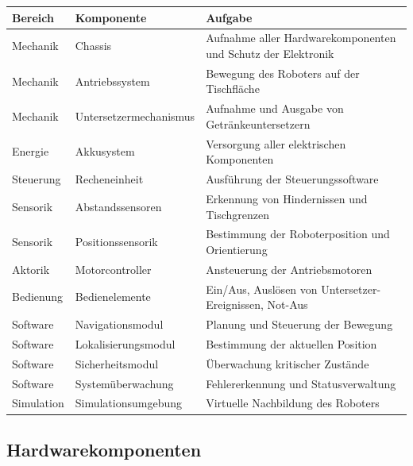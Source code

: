 \begin{longtable}[]{@{}
  >{\raggedright\arraybackslash}p{}
  >{\raggedright\arraybackslash}p{}
  >{\raggedright\arraybackslash}p{}@{}}
\toprule\noalign{}
\begin{minipage}[b]{\linewidth}\raggedright
Bereich
\end{minipage} & \begin{minipage}[b]{\linewidth}\raggedright
Komponente
\end{minipage} & \begin{minipage}[b]{\linewidth}\raggedright
Aufgabe
\end{minipage} \\
\midrule\noalign{}
\endhead
\bottomrule\noalign{}
\endlastfoot
Mechanik & Chassis & Aufnahme aller Hardwarekomponenten und Schutz der
Elektronik \\
Mechanik & Antriebssystem & Bewegung des Roboters auf der Tischfläche \\
Mechanik & Untersetzermechanismus & Aufnahme und Ausgabe von
Getränkeuntersetzern \\
Energie & Akkusystem & Versorgung aller elektrischen Komponenten \\
Steuerung & Recheneinheit & Ausführung der Steuerungssoftware \\
Sensorik & Abstandssensoren & Erkennung von Hindernissen und
Tischgrenzen \\
Sensorik & Positionssensorik & Bestimmung der Roboterposition und
Orientierung \\
Aktorik & Motorcontroller & Ansteuerung der Antriebsmotoren \\
Bedienung & Bedienelemente & Ein/Aus, Auslösen von
Untersetzer-Ereignissen, Not-Aus \\
Software & Navigationsmodul & Planung und Steuerung der Bewegung \\
Software & Lokalisierungsmodul & Bestimmung der aktuellen Position \\
Software & Sicherheitsmodul & Überwachung kritischer Zustände \\
Software & Systemüberwachung & Fehlererkennung und Statusverwaltung \\
Simulation & Simulationsumgebung & Virtuelle Nachbildung des Roboters \\
\end{longtable}

\subsection{Hardwarekomponenten}\label{hardwarekomponenten}

